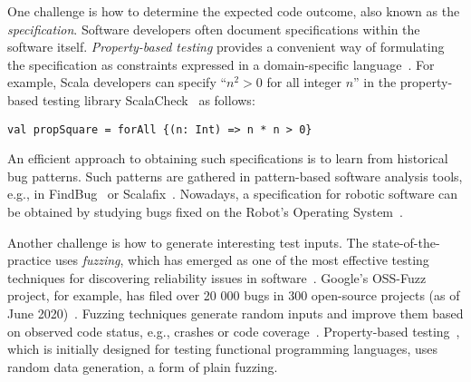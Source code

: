 \documentclass[fleqn,12pt]{article}
\begin{document}
One challenge is how to determine the expected code outcome, also
known as the \emph{specification}.  Software developers often document
specifications within the software itself.  \emph{Property-based testing}
provides a convenient way of formulating the specification as constraints
expressed in a domain-specific
language~\cite{DBLP:conf/icfp/ClaessenH00}.  For example, Scala developers
can specify ``$n^2>0$ for all integer $n$'' in the
property-based testing library ScalaCheck~\cite{nilsson2014scalacheck}
as follows:
\begin{lstlisting}[numbers=none]
val propSquare = forAll {(n: Int) => n * n > 0}
\end{lstlisting}
An efficient approach to obtaining such specifications is to learn from
historical bug patterns. Such patterns are gathered in pattern-based
software analysis tools, e.g., in
FindBug~\cite{DBLP:conf/paste/AyewahPMPZ07} or
Scalafix~\cite{web:scalafix}.  Nowadays, a specification for robotic
software can be obtained by studying bugs fixed on the Robot's
Operating System~\cite{nielsenFSW2020dependencybugs}.







Another challenge is how to generate interesting test inputs.  The
state-of-the-practice uses \emph{fuzzing}, which has emerged as one of
the most effective testing techniques for discovering reliability
issues in software~\cite{takanen2018fuzzing}.  Google's OSS-Fuzz
project, for example, has filed over 20 000 bugs in 300 open-source
projects (as of June 2020)~\cite{web:oss-fuzz}.  Fuzzing techniques
generate random inputs and improve them based on observed code status,
e.g., crashes or code
coverage~\cite{DBLP:journals/tse/BohmePR19,DBLP:conf/pldi/FuS17}.
Property-based testing~\cite{DBLP:conf/icfp/ClaessenH00}, which is
initially designed for testing functional programming languages, uses
random data generation, a form of plain fuzzing.
\end{document}
